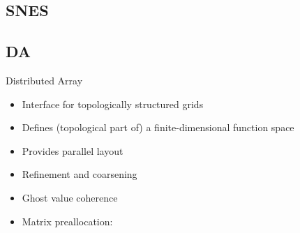 
\subsection{SNES}





\subsection{DA}
\begin{frame}{Distributed Array}
  \begin{itemize}
  \item Interface for topologically structured grids
  \item Defines (topological part of) a finite-dimensional function space
  \item Provides parallel layout
  \item Refinement and coarsening
  \item Ghost value coherence
  \item Matrix preallocation: 
  \end{itemize}
\end{frame}











